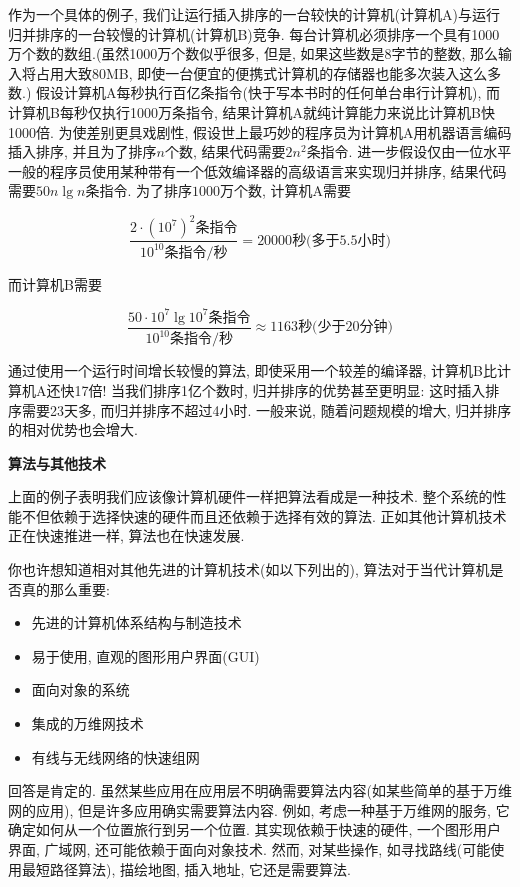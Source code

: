 \documentclass[oneside,10pt,fontset=none]{ctexbook}
\begin{document}
作为一个具体的例子, 我们让运行插入排序的一台较快的计算机(计算机A)与运行归并排序的一台较慢的计算机(计算机B)竞争. 每台计算机必须排序一个具有1000万个数的数组.(虽然1000万个数似乎很多, 但是, 如果这些数是8字节的整数, 那么输入将占用大致80MB, 即使一台便宜的便携式计算机的存储器也能多次装入这么多数.) 假设计算机A每秒执行百亿条指令(快于写本书时的任何单台串行计算机), 而计算机B每秒仅执行1000万条指令, 结果计算机A就纯计算能力来说比计算机B快1000倍. 为使差别更具戏剧性, 假设世上最巧妙的程序员为计算机A用机器语言编码插入排序, 并且为了排序$n$个数, 结果代码需要$2n^2$条指令. 进一步假设仅由一位水平一般的程序员使用某种带有一个低效编译器的高级语言来实现归并排序, 结果代码需要$50n\lg n$条指令. 为了排序$1000$万个数, 计算机A需要

$$
\frac{2\cdot (10^7)^2\text{条指令}}{10^10\text{条指令/秒}} = 20000\text{秒(多于5.5小时)}
$$

而计算机B需要

$$
\frac{50\cdot 10^7\lg{10^7}\text{条指令}}{10^10\text{条指令/秒}} \approx 1163\text{秒(少于20分钟)}
$$

通过使用一个运行时间增长较慢的算法, 即使采用一个较差的编译器, 计算机B比计算机A还快17倍! 当我们排序1亿个数时, 归并排序的优势甚至更明显: 这时插入排序需要23天多, 而归并排序不超过4小时. 一般来说, 随着问题规模的增大, 归并排序的相对优势也会增大.

\textbf{算法与其他技术}

上面的例子表明我们应该像计算机硬件一样把算法看成是一种技术. 整个系统的性能不但依赖于选择快速的硬件而且还依赖于选择有效的算法. 正如其他计算机技术正在快速推进一样, 算法也在快速发展.

你也许想知道相对其他先进的计算机技术(如以下列出的), 算法对于当代计算机是否真的那么重要:

\begin{itemize}
    \item 先进的计算机体系结构与制造技术
    \item 易于使用, 直观的图形用户界面(GUI)
    \item 面向对象的系统
    \item 集成的万维网技术
    \item 有线与无线网络的快速组网
\end{itemize}

回答是肯定的. 虽然某些应用在应用层不明确需要算法内容(如某些简单的基于万维网的应用), 但是许多应用确实需要算法内容. 例如, 考虑一种基于万维网的服务, 它确定如何从一个位置旅行到另一个位置. 其实现依赖于快速的硬件, 一个图形用户界面, 广域网, 还可能依赖于面向对象技术. 然而, 对某些操作, 如寻找路线(可能使用最短路径算法), 描绘地图, 插入地址, 它还是需要算法.
\end{document}
